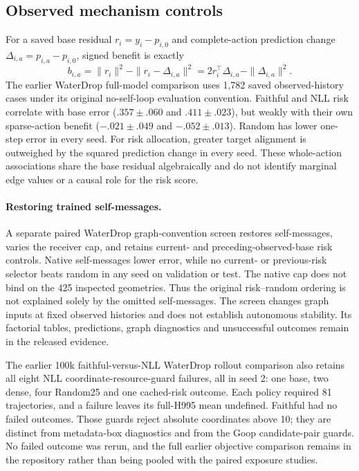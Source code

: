 \subsection{Observed mechanism controls}
\label{sec:actual-action-benefit}
For a saved base residual $r_i=y_i-p_{i,0}$ and complete-action prediction change $\Delta_{i,a}=p_{i,a}-p_{i,0}$, signed benefit is exactly
\begin{equation}
 b_{i,a}=\|r_i\|^2-\|r_i-\Delta_{i,a}\|^2
        =2r_i^\top\Delta_{i,a}-\|\Delta_{i,a}\|^2.
\end{equation}
The earlier WaterDrop full-model comparison uses 1,782 saved observed-history cases under its original no-self-loop evaluation convention. Faithful and NLL risk correlate with base error ($.357\pm.060$ and $.411\pm.023$), but weakly with their own sparse-action benefit ($-.021\pm.049$ and $-.052\pm.013$). Random has lower one-step error in every seed. For risk allocation, greater target alignment is outweighed by the squared prediction change in every seed. These whole-action associations share the base residual algebraically and do not identify marginal edge values or a causal role for the risk score.

\paragraph{Restoring trained self-messages.}\label{sec:graph-bridge}
A separate paired WaterDrop graph-convention screen restores self-messages, varies the receiver cap, and retains current- and preceding-observed-base risk controls. Native self-messages lower error, while no current- or previous-risk selector beats random in any seed on validation or test. The native cap does not bind on the 425 inspected geometries. Thus the original risk--random ordering is not explained solely by the omitted self-messages. The screen changes graph inputs at fixed observed histories and does not establish autonomous stability. Its factorial tables, predictions, graph diagnostics and unsuccessful outcomes remain in the released evidence.

The earlier 100k faithful-versus-NLL WaterDrop rollout comparison also retains all eight NLL coordinate-resource-guard failures, all in seed 2: one base, two dense, four Random25 and one cached-risk outcome. Each policy required 81 trajectories, and a failure leaves its full-H995 mean undefined. Faithful had no failed outcomes. Those guards reject absolute coordinates above 10; they are distinct from metadata-box diagnostics and from the Goop candidate-pair guards. No failed outcome was rerun, and the full earlier objective comparison remains in the repository rather than being pooled with the paired exposure studies.

